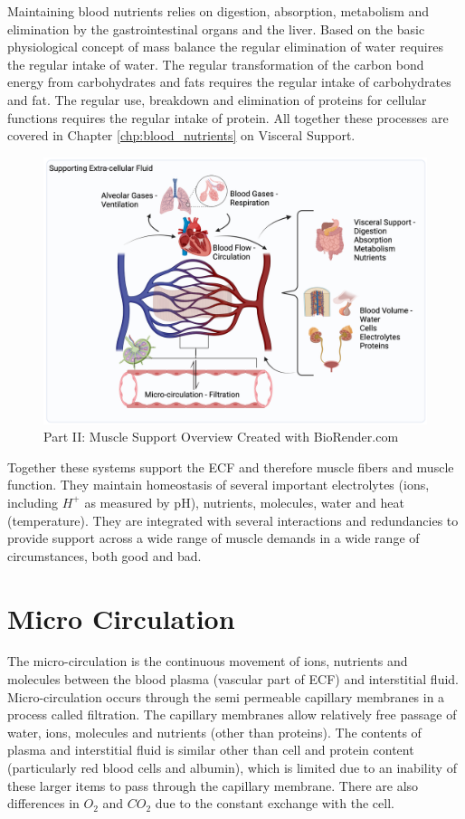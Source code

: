 Maintaining blood nutrients relies on digestion, absorption, metabolism and elimination by the gastrointestinal organs and the liver. Based on the basic physiological concept of mass balance the regular elimination of water requires the regular intake of water. The regular transformation of the carbon bond energy from carbohydrates and fats requires the regular intake of carbohydrates and fat. The regular use, breakdown and elimination of proteins for cellular functions requires the regular intake of protein. All together these processes are covered in Chapter \ref{chp:blood_nutrients} on Visceral Support.

\begin{figure}[!h]
    \centering
    \includegraphics[width=1\linewidth]{./figure/part2_overview.png}
    \caption{Part II: Muscle Support Overview \footnotesize{Created with BioRender.com}}
    \label{fig:part2_overview}
\end{figure}

Together these systems support the ECF and therefore muscle fibers and muscle function. They maintain homeostasis of several important electrolytes (ions, including $H^+$ as measured by pH), nutrients, molecules, water and heat (temperature). They are integrated with several interactions and redundancies to provide support across a wide range of muscle demands in a wide range of circumstances, both good and bad.

\section{Micro Circulation}

The micro-circulation is the continuous movement of ions, nutrients and molecules between the blood plasma (vascular part of ECF) and interstitial fluid. Micro-circulation occurs through the semi permeable capillary membranes in a process called filtration. The capillary membranes allow relatively free passage of water, ions, molecules and  nutrients (other than proteins). The contents of plasma and interstitial fluid is similar other than cell and protein content (particularly red blood cells and albumin), which is limited due to an inability of these larger items to pass through the capillary membrane. There are also differences in $O_2$ and $CO_2$ due to the constant exchange with the cell.

